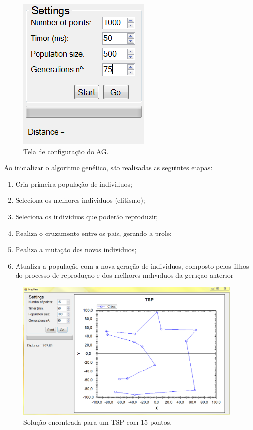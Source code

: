 \documentclass[twoside]{article}
\begin{document}
\begin{multicols}{2}
\begin{enumerate}
\end{enumerate}

\begin{figure}[H]
\label{fig:userview}
  \caption{Tela de configuração do AG.}
  \centering
    \includegraphics[scale = 0.8]{user_view.png}
\end{figure}

Ao inicializar o algoritmo genético, são realizadas as seguintes etapas:
\begin{enumerate}
\item Cria primeira população de individuos;
\item Seleciona os melhores individuos (elitismo);
\item Seleciona os indivíduos que poderão reproduzir;
\item Realiza o cruzamento entre os pais, gerando a prole;
\item Realiza a mutação dos novos individuos;
\item Atualiza a população com a nova geração de individuos, composto pelos filhos do processo de reprodução e dos melhores individuos da geração anterior.
\end{enumerate}

\begin{figure}[H]
\label{fig:tspa}
  \caption{Solução encontrada para um TSP com 15 pontos.}
  \centering
    \includegraphics[scale = 0.25]{prog_tsp.png}
\end{figure}



\end{multicols}
\end{document}
